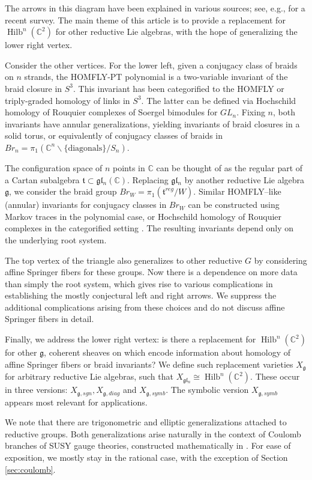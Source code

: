 \documentclass{amsart}
\numberwithin{equation}{section}
\theoremstyle{definition}
\DeclareMathOperator{\Hilb}{Hilb}
\newcommand{\fl}{\mathfrak{l}}
\newcommand{\fg}{\mathfrak{g}}
\newcommand{\ft}{\mathfrak{t}}
\newcommand{\C}{{\mathbb C}}
\begin{document}
The arrows in this diagram have been explained in various sources; see, e.g., \cite{GKS} for a recent survey.
The main theme of this article is to provide a replacement for $\Hilb^n(\C^2)$ for other reductive Lie algebras, with the hope of generalizing the lower right vertex.

Consider the other vertices. 
For the lower left, given a conjugacy class of braids on $n$ strands, the HOMFLY-PT polynomial is a two-variable invariant of the braid closure in $S^3$. 
This invariant has been categorified to the HOMFLY or triply-graded homology of links in $S^3$. The latter can be defined via Hochschild homology of Rouquier complexes of Soergel bimodules for $GL_n$. Fixing $n$, both invariants have annular generalizations, yielding invariants of braid closures in a solid torus, or equivalently of conjugacy classes of braids in $Br_n=\pi_1(\C^n\backslash\{\text{diagonals}\}/S_n)$.  
 
The configuration space of $n$ points in $\C$ can be thought of as the regular part of a Cartan subalgebra $\ft\subset \fg\fl_n(\C)$. Replacing $\fg\fl_n$ by another reductive Lie algebra $\fg$, we consider the braid group $Br_W=\pi_1(\ft^{reg}/W)$. 
Similar HOMFLY--like (annular) invariants for conjugacy classes in $Br_W$ can be constructed using Markov traces in the polynomial case, or Hochschild homology of Rouquier complexes in the categorified setting \cite{WW, Trinh}. The resulting invariants depend only on the underlying root system. 

The top vertex of the triangle also generalizes to other reductive $G$ by considering affine Springer fibers for these groups. Now there is a dependence on more data than simply the root system, which gives rise to various complications in establishing the mostly conjectural left and right arrows. We suppress the additional complications arising from these choices and do not discuss affine Springer fibers in detail.

Finally, we address the lower right vertex: is there a replacement for $\Hilb^n(\C^2)$ for other $\fg$, coherent sheaves on which encode information about homology of affine Springer fibers or braid invariants? 
We define such replacement varieties $X_\fg$ for arbitrary reductive Lie algebras, such that $X_{\fg\fl_n}\cong \Hilb^n(\C^2)$. These occur in three versions: $X_{\fg, sgn}, X_{\fg,diag}$ and $X_{\fg,symb}$. The symbolic version $X_{\fg, symb}$ appears most relevant for applications.

We note that there are trigonometric and elliptic generalizations attached to reductive groups. Both generalizations arise naturally in the context of Coulomb branches of SUSY gauge theories, constructed mathematically in \cite{BFN}. For ease of exposition, we mostly stay in the rational case, with the exception of Section \ref{sec:coulomb}.
\end{document}
